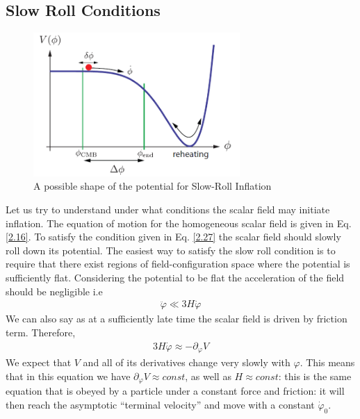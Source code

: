 \subsection{Slow Roll Conditions}
\begin{figure}[h]
    \centering
    \includegraphics[width=0.7\textwidth]{inflaton.png}
    \caption{A possible shape of the potential for Slow-Roll Inflation \cite{baumann2012tasi}}
    \label{fig:2.2} 
\end{figure}
\hspace{0.5cm} Let us try to understand under what conditions the scalar field may initiate inflation. The equation of motion for the homogeneous scalar field is given in Eq. \ref{2.16}. To satisfy the condition given in Eq. \ref{2.27} the scalar field should slowly roll down its potential. The easiest way to satisfy the slow roll condition is to require that there exist regions of field-configuration space where the potential is sufficiently flat. Considering the potential to be flat the acceleration of the field should be negligible i.e
\begin{align}
    \ddot{\varphi} \ll 3H\dot{\varphi} \label{2.29}
\end{align}
We can also say as at a sufficiently late time the scalar field is driven by friction term. Therefore,
\begin{align}
    3H\dot{\varphi} \approx -\partial_{\varphi} V \label{2.30}
\end{align}
We expect that $V$ and all of its derivatives change very slowly with $\varphi$.
This means that in this equation we have \(\partial_{\varphi} V \approx const\), as well as \(H \approx const\): this is the same equation that is obeyed by a particle under a constant force and friction: it will then reach the asymptotic ``{terminal velocity}'' and move with a constant \(\dot{\varphi}_0 \).\\ 

